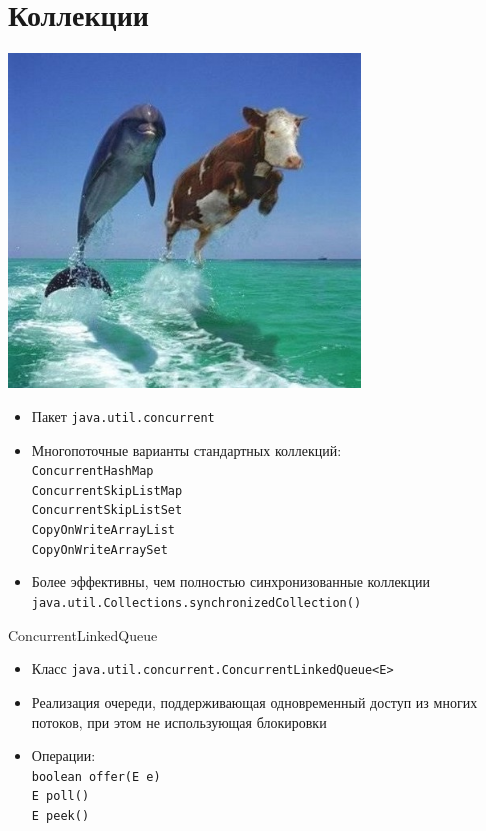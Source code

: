 \documentclass[unicode]{beamer}
\begin{document}
\section{Коллекции}

\begin{frame}
\centering
\includegraphics[width=0.7\textwidth]{pics/collections.jpg}
\end{frame}


\begin{frame}
\begin{itemize}
\item Пакет \texttt{java.util.concurrent}
    \bigskip

\item Многопоточные варианты стандартных коллекций:\\
    \texttt{ConcurrentHashMap}\\
    \texttt{ConcurrentSkipListMap}\\
    \texttt{ConcurrentSkipListSet}\\
    \texttt{CopyOnWriteArrayList}\\
    \texttt{CopyOnWriteArraySet}
    \bigskip

\item Более эффективны, чем полностью синхронизованные коллекции\\
    \lstinline|java.util.Collections.synchronizedCollection()|
\end{itemize}
\end{frame}


\begin{frame}{ConcurrentLinkedQueue}
\begin{itemize}
\item Класс \texttt{java.util.concurrent.ConcurrentLinkedQueue<E>}
    \bigskip

\item Реализация очереди, поддерживающая одновременный доступ из
    многих потоков, при этом не использующая блокировки
    \bigskip

\item Операции:\\
    \lstinline|boolean offer(E e)|\\
    \lstinline|E poll()|\\
    \lstinline|E peek()|
\end{itemize}
\end{frame}
\end{document}
